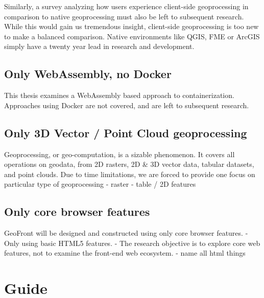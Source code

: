 
Similarly, a survey analyzing how users experience client-side geoprocessing in comparison to native geoprocessing must also be left to subsequent research. While this would gain us tremendous insight, client-side geoprocessing is too new to make a balanced comparison. Native environments like QGIS, FME or ArcGIS simply have a twenty year lead in research and development. 



\subsection {Only WebAssembly, no Docker}
This thesis examines a WebAssembly based approach to containerization. Approaches using Docker are not covered, and are left to subsequent research.

\subsection*{ Only 3D Vector / Point Cloud geoprocessing}
Geoprocessing, or geo-computation, is a sizable phenomenon. 
It covers all operations on geodata, from 2D rasters, 2D \& 3D vector data, tabular datasets, and point clouds. 
Due to time limitations, we are forced to provide one focus on particular type of geoprocessing
- raster
- table / 2D features

\subsection*{ Only core browser features }
GeoFront will be designed and constructed using only core browser features. 
- Only using basic HTML5 features.
- The research objective is to explore core web features, not to examine the front-end web ecosystem. 
- name all html things

\section{Guide}

